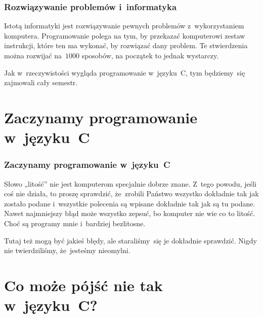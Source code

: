 \documentclass[10pt,t]{beamer}
\begin{document}
\begin{frame}
  \frametitle{Rozwiązywanie problemów i~informatyka}


  Istotą informatyki jest rozwiązywanie pewnych problemów z~wykorzystaniem
  komputera. Programowanie polega na tym, by przekazać komputerowi zestaw
  instrukcji, które ten ma wykonać, by rozwiązać dany problem. Te
  stwierdzenia można rozwijać na~$1000$ sposobów, na początek to jednak
  wystarczy.

  Jak w~rzeczywistości wygląda programowanie w~języku~C, tym będziemy~się
  zajmowali cały semestr.

\end{frame}










\section{Zaczynamy programowanie w~języku~C}


\begin{frame}
  \frametitle{Zaczynamy programowanie w~języku~C}


  Słowo „litość” nie jest komputerom specjalnie dobrze znane. Z~tego
  powodu, jeśli coś nie działa, to proszę sprawdzić, że~zrobili
  Państwo \alert{wszystko} dokładnie tak jak zostało podane i~wszystkie
  polecenia są wpisane \alert{dokładnie} tak jak są tu podane. Nawet
  najmniejszy błąd może wszystko zepsuć, bo komputer nie wie co to litość.
  Choć są programy mnie i~bardziej bezlitosne.

  Tutaj też mogą być jakieś błędy, ale staraliśmy~się je dokładnie
  sprawdzić. Nigdy nie twierdziliśmy, że~jesteśmy nieomylni.

\end{frame}










\section{Co może pójść nie tak w~języku~C?}
\end{document}
